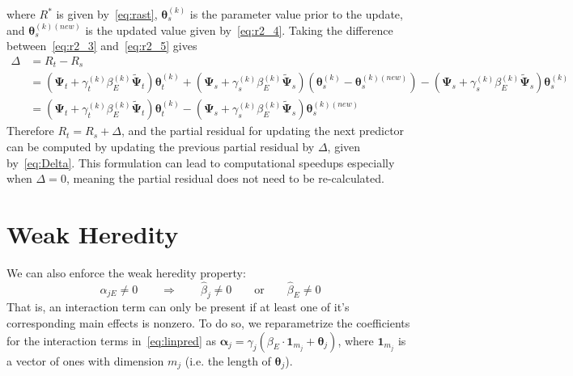\documentclass[12pt,letter]{article}\usepackage[]{graphicx}\usepackage[]{color}
\newcommand{\tm}[1]{\textrm{{#1}}}
\newcommand{\balpha}{\boldsymbol{\alpha}}
\newcommand{\mb}[1]{\mathbf{#1}}
\newcommand{\btheta}{\boldsymbol{\theta}}
\newcommand{\bPsi}{\boldsymbol{\Psi}}
\begin{document}
where $R^\ast$ is given by~\eqref{eq:rast}, $\btheta_s^{(k)}$ is the parameter value prior to the update, and $\btheta_s^{(k)(new)}$ is the updated value given by~\eqref{eq:r2_4}. Taking the difference between~\eqref{eq:r2_3} and~\eqref{eq:r2_5} gives
\begin{align}
	\Delta & = R_t - R_s \nonumber\\
	& = (\bPsi_t + \gamma_t^{(k)}\beta_E^{(k)} \widetilde{\bPsi}_t)\btheta_t^{(k)} + (\bPsi_s + \gamma_s^{(k)}\beta_E^{(k)} \widetilde{\bPsi}_s)(\btheta_s^{(k)} - \btheta_s^{(k)(new)}) - (\bPsi_s + \gamma_s^{(k)}\beta_E^{(k)} \widetilde{\bPsi}_s)\btheta_s^{(k)} \nonumber\\
	& = (\bPsi_t + \gamma_t^{(k)}\beta_E^{(k)} \widetilde{\bPsi}_t)\btheta_t^{(k)} - (\bPsi_s + \gamma_s^{(k)}\beta_E^{(k)} \widetilde{\bPsi}_s)\btheta_s^{(k)(new)} \label{eq:Delta}
\end{align} 
Therefore $R_t = R_s + \Delta$, and the partial residual for updating the next predictor can be computed by updating the previous partial residual by $\Delta$, given by~\eqref{eq:Delta}. This formulation can lead to computational speedups especially when $\Delta = 0$, meaning the partial residual does not need to be re-calculated.  




\section{Weak Heredity}
We can also enforce the weak heredity property:
\begin{equation}
	\hat{\alpha}_{jE} \neq 0 \qquad \Rightarrow \qquad \hat{\beta}_j \neq 0 \qquad \tm{or} \qquad \hat{\beta}_E \neq 0   \label{eq:heredity2}
\end{equation}
That is, an interaction term can only be present if at least one of it's corresponding main effects is nonzero. To do so, we reparametrize the coefficients for the interaction terms in~\eqref{eq:linpred} as $\balpha_{j} = \gamma_{j}  (\beta_E \cdot \mb{1}_{m_j} + \btheta_j)$, where $\mb{1}_{m_j}$ is a vector of ones with dimension $m_j$ (i.e. the length of $\btheta_j$). 
\end{document}
